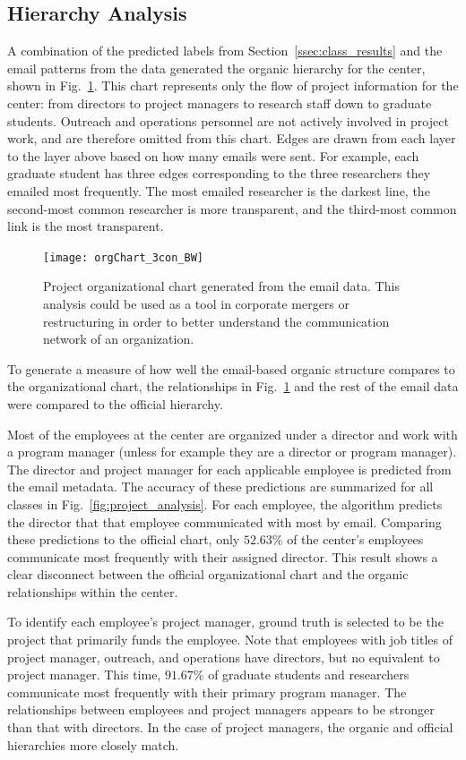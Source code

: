 \documentclass[10pt,twocolumn,conference]{IEEEtran}
\begin{document}
\subsection{Hierarchy Analysis}
A combination of the predicted labels from Section~\ref{ssec:class_results} and the email patterns from the data generated the organic hierarchy for the center, shown in Fig.~\ref{fig:org_chart}.
This chart represents only the flow of project information for the center: from directors to project managers to research staff down to graduate students.
Outreach and operations personnel are not actively involved in project work, and are therefore omitted from this chart.
Edges are drawn from each layer to the layer above based on how many emails were sent.
For example, each graduate student has three edges corresponding to the three researchers they emailed most frequently.
The most emailed researcher is the darkest line, the second-most common researcher is more transparent, and the third-most common link is the most transparent.

\begin{figure}[t]
	\centering
	\texttt{[image: orgChart\_3con\_BW]}
	\caption{Project organizational chart generated from the email data. This analysis could be used as a tool in corporate mergers or restructuring in order to better understand the communication network of an organization.}
	\label{fig:org_chart}
\end{figure}

To generate a measure of how well the email-based organic structure compares to the organizational chart, the relationships in Fig.~\ref{fig:org_chart} and the rest of the email data were compared to the official hierarchy.

Most of the employees at the center are organized under a director and work with a program manager (unless for example they are a director or program manager).
The director and project manager for each applicable employee is predicted from the email metadata.
The accuracy of these predictions are summarized for all classes in Fig.~\ref{fig:project_analysis}.
For each employee, the algorithm predicts the director that that employee communicated with most by email.
Comparing these predictions to the official chart, only $52.63\%$ of the center's employees communicate most frequently with their assigned director.
This result shows a clear disconnect between the official organizational chart and the organic relationships within the center.

To identify each employee's project manager, ground truth is selected to be the project that primarily funds the employee.
Note that employees with job titles of project manager, outreach, and operations have directors, but no equivalent to project manager.
This time, $91.67\%$ of graduate students and researchers communicate most frequently with their primary program manager.
The relationships between employees and project managers appears to be stronger than that with directors.
In the case of project managers, the organic and official hierarchies more closely match.
\end{document}
